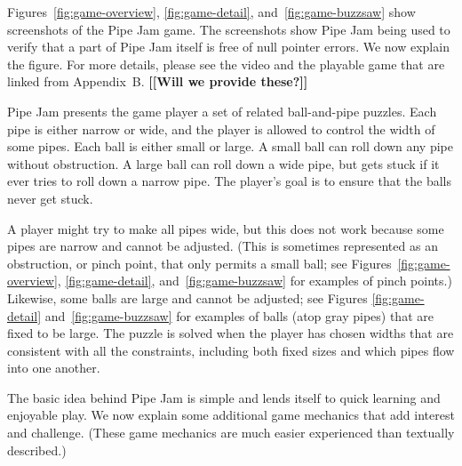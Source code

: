 \documentclass[preprint]{sig-alternate}
\newcommand{\todo}[1]{{\color{red}\bfseries [[#1]]}}
\begin{document}
Figures~\ref{fig:game-overview}, \ref{fig:game-detail},
and~\ref{fig:game-buzzsaw} show screenshots of the Pipe Jam game.  The
screenshots show Pipe Jam being used to verify that a part of Pipe Jam
itself is free of null pointer errors.  We now explain the figure.
For more details, please see the video and the playable game that are
linked from Appendix~B\@. \todo{Will we provide these?}

Pipe Jam presents the game player a set of related ball-and-pipe
puzzles.  Each pipe is either narrow or wide, and the player is
allowed to control the width of some pipes.  Each ball is either small
or large.  A small ball can roll down any pipe without obstruction.  A
large ball can roll down a wide pipe, but gets stuck if it ever tries
to roll down a narrow pipe.  The player's goal is to ensure that the
balls never get stuck.

A player might try to make all pipes wide, but this does not work
because some pipes are narrow and cannot be adjusted.  (This is
sometimes represented as an obstruction, or pinch point, that only
permits a small ball; see Figures~\ref{fig:game-overview},
\ref{fig:game-detail}, and~\ref{fig:game-buzzsaw} for examples of
pinch points.)  Likewise, some balls are large and cannot be adjusted;
see Figures \ref{fig:game-detail} and~\ref{fig:game-buzzsaw} for
examples of balls (atop gray pipes) that are fixed to be large.  The
puzzle is solved when the player has chosen widths that are consistent
with all the constraints, including both fixed sizes and which pipes
flow into one another.

The basic idea behind Pipe Jam is simple and lends itself to quick
learning and enjoyable play.  We now explain some additional game
mechanics that add interest and challenge.  (These game mechanics are
much easier experienced than textually described.)
\end{document}
